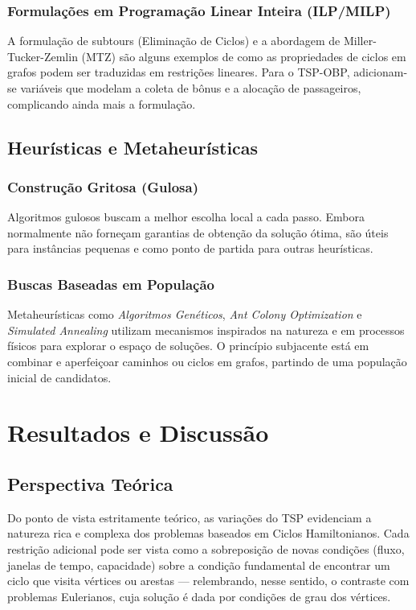 \documentclass[12pt, a4paper]{report}
\begin{document}
\subsection{Formulações em Programação Linear Inteira (ILP/MILP)}
A formulação de subtours (Eliminação de Ciclos) e a abordagem de Miller-Tucker-Zemlin (MTZ) são alguns exemplos de como as propriedades de ciclos em grafos podem ser traduzidas em restrições lineares. Para o TSP-OBP, adicionam-se variáveis que modelam a coleta de bônus e a alocação de passageiros, complicando ainda mais a formulação.

\section{Heurísticas e Metaheurísticas}
\subsection{Construção Gritosa (Gulosa)}
Algoritmos gulosos buscam a melhor escolha local a cada passo. Embora normalmente não forneçam garantias de obtenção da solução ótima, são úteis para instâncias pequenas e como ponto de partida para outras heurísticas.

\subsection{Buscas Baseadas em População}
Metaheurísticas como \textit{Algoritmos Genéticos}, \textit{Ant Colony Optimization} e \textit{Simulated Annealing} utilizam mecanismos inspirados na natureza e em processos físicos para explorar o espaço de soluções. O princípio subjacente está em combinar e aperfeiçoar caminhos ou ciclos em grafos, partindo de uma população inicial de candidatos.

\chapter{Resultados e Discussão}
\section{Perspectiva Teórica}
Do ponto de vista estritamente teórico, as variações do TSP evidenciam a natureza rica e complexa dos problemas baseados em Ciclos Hamiltonianos. Cada restrição adicional pode ser vista como a sobreposição de novas condições (fluxo, janelas de tempo, capacidade) sobre a condição fundamental de encontrar um ciclo que visita vértices ou arestas — relembrando, nesse sentido, o contraste com problemas Eulerianos, cuja solução é dada por condições de grau dos vértices.
\end{document}
